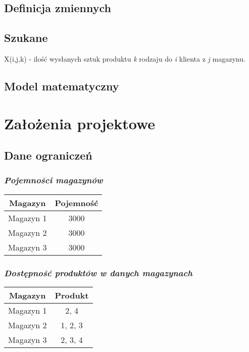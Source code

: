 \documentclass[a4paper]{article}
\begin{document}
\subsection{Definicja zmiennych}
\subsection{Szukane}
X(i,j,k) - ilość wysłanych sztuk produktu \textit{k} rodzaju do \textit{i} klienta z \textit{j} magazynu.
\subsection{Model matematyczny}

\newpage 

\section{Założenia projektowe}
\subsection{Dane ograniczeń}
\subsubsection{\textit{Pojemności magazynów}}
\begin{center}
	\begin{tabular}{ |c|c| } 
		\hline
		 Magazyn & Pojemność\\
		\hline
		Magazyn 1 & 3000  \\ 
		\hline
		Magazyn 2 & 3000  \\ 
		\hline
		Magazyn 3 & 3000  \\ 
		\hline
	\end{tabular}
\end{center}

\subsubsection{\textit{Dostępność produktów w danych magazynach}}
\begin{center}
	\begin{tabular}{ |c|c| } 
		\hline
		Magazyn & Produkt \\
		\hline
		Magazyn 1 & 2, 4  \\ 
		\hline
		Magazyn 2 & 1, 2, 3  \\ 
		\hline
		Magazyn 3 & 2, 3, 4  \\ 
		\hline
	\end{tabular}
\end{center}
\end{document}
